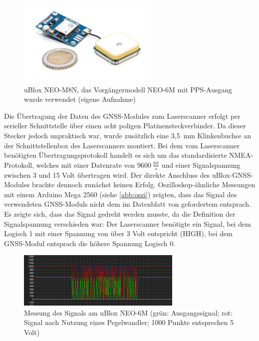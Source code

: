\documentclass[a4paper,12pt,bibliography=totoc, listof=totoc,titlepage,pointlessnumbers]{scrreprt}
\begin{document}
\begin{figure}[!ht]
 \centering
 \includegraphics[width=0.6\textwidth]{./img/ublox.jpg}
 \caption{uBlox NEO-M8N, das Vorgängermodell NEO-6M mit PPS-Ausgang wurde verwendet (eigene Aufnahme)}
 \label{img:ublox}
\end{figure}

Die Übertragung der Daten des GNSS-Modules zum Laser\-scan\-ner erfolgt per serieller Schnittstelle über einen acht poligen Platinensteckverbinder. Da dieser Stecker jedoch unpraktisch war, wurde zusätzlich eine 3,5~mm Klinkenbuchse an der Schnittstellenbox des Laser\-scan\-ners montiert. Bei dem vom Laser\-scan\-ner benötigten Übertragungsprotokoll handelt es sich um das standardisierte NMEA-Protokoll, welches mit einer Datenrate von \(9600~\frac{bit}{s}\) und einer Signalspannung zwischen 3 und 15 Volt übertragen wird. Der direkte Anschluss des uBlox-GNSS-Modules brachte dennoch zunächst keinen Erfolg. Oszilloskop-ähnliche Messungen mit einem Arduino Mega 2560 (siehe \autoref{abb:oszi}) zeigten, dass das Signal des verwendeten GNSS-Moduls nicht dem im Datenblatt von \citet[S. 3]{vlpInterface} gefordertem entsprach. Es zeigte sich, dass das Signal gedreht werden musste, da die Definition der Signalspannung verschieden war: Der Laser\-scan\-ner benötigte ein Signal, bei dem Logisch 1 mit einer Spannung von über 3 Volt \citep[S. 3]{vlpInterface} entspricht (HIGH), bei dem GNSS-Modul entsprach die höhere Spannung Logisch 0.

\begin{figure}[!ht]
 \centering
 \includegraphics[width=0.7\textwidth]{img/oszi.png}
 \caption{Messung des Signals am uBlox NEO-6M (grün: Ausgangssignal; rot: Signal nach Nutzung eines Pegelwandler; 1000 Punkte entsprechen 5 Volt)}
 \label{abb:oszi}
\end{figure}
\end{document}
